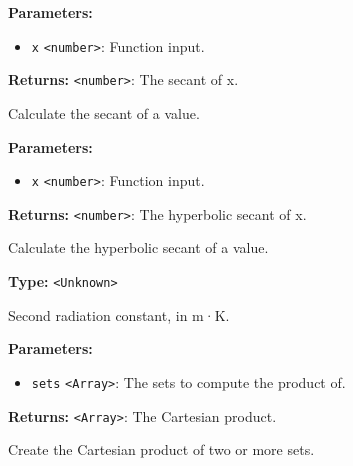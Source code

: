 \documentclass[12pt,a4paper]{article}
\begin{document}
\vspace{5mm}
\noindent {}


\noindent \textbf{Parameters:}
\begin{itemize}
  \item \texttt{x} \texttt{<number>}: Function input.
\end{itemize}

\noindent \textbf{Returns:} \texttt{<number>}: The secant of x.

\noindent Calculate the secant of a value.

\vspace{5mm}
\noindent {}


\noindent \textbf{Parameters:}
\begin{itemize}
  \item \texttt{x} \texttt{<number>}: Function input.
\end{itemize}

\noindent \textbf{Returns:} \texttt{<number>}: The hyperbolic secant of x.

\noindent Calculate the hyperbolic secant of a value.

\vspace{5mm}
\noindent {}\vspace{4mm}


\noindent \textbf{Type:} \texttt{<Unknown>}

\noindent Second radiation constant, in m·K.

\vspace{5mm}
\noindent {}


\noindent \textbf{Parameters:}
\begin{itemize}
  \item \texttt{sets} \texttt{<Array>}: The sets to compute the product of.
\end{itemize}

\noindent \textbf{Returns:} \texttt{<Array>}: The Cartesian product.

\noindent Create the Cartesian product of two or more sets.
\end{document}
